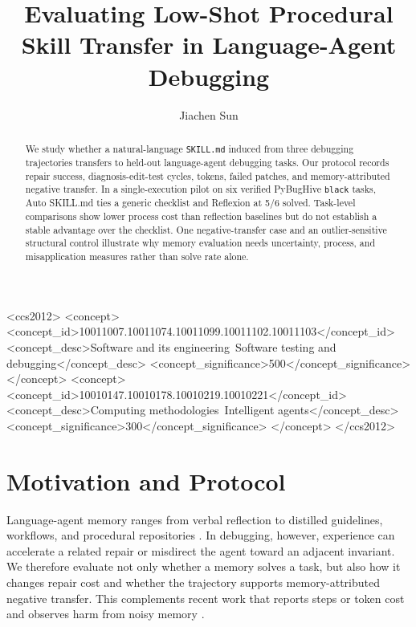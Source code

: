\documentclass[sigconf,screen,pbalance]{acmart}
\begin{document}
\shrinkLastPage{75pt}

\title{Evaluating Low-Shot Procedural Skill Transfer in Language-Agent
Debugging}

\author{Jiachen Sun}
\correspondingauthor
{}

\begin{abstract}
We study whether a natural-language \texttt{SKILL.md} induced from three
debugging trajectories transfers to held-out language-agent debugging tasks.
Our protocol records repair success, diagnosis-edit-test cycles, tokens,
failed patches, and memory-attributed negative transfer. In a single-execution
pilot on six verified PyBugHive \texttt{black} tasks, Auto SKILL.md ties a
generic checklist and Reflexion at 5/6 solved. Task-level comparisons show
lower process cost than reflection baselines but do not establish a stable
advantage over the checklist. One negative-transfer case and an outlier-sensitive
structural control illustrate why memory evaluation needs uncertainty,
process, and misapplication measures rather than solve rate alone.
\end{abstract}

\begin{CCSXML}
<ccs2012>
   <concept>
       <concept_id>10011007.10011074.10011099.10011102.10011103</concept_id>
       <concept_desc>Software and its engineering~Software testing and debugging</concept_desc>
       <concept_significance>500</concept_significance>
   </concept>
   <concept>
       <concept_id>10010147.10010178.10010219.10010221</concept_id>
       <concept_desc>Computing methodologies~Intelligent agents</concept_desc>
       <concept_significance>300</concept_significance>
   </concept>
</ccs2012>
\end{CCSXML}



\maketitle

\section{Motivation and Protocol}
Language-agent memory ranges from verbal reflection to distilled guidelines,
workflows, and procedural repositories
\cite{shinn2023reflexion,zhao2024expel,wang2025workflowmemory,fang2026memp}.
In debugging, however, experience can accelerate a related repair or misdirect
the agent toward an adjacent invariant. We therefore evaluate not only whether
a memory solves a task, but also how it changes repair cost and whether the
trajectory supports memory-attributed negative transfer. This complements
recent work that reports steps or token cost and observes harm from noisy
memory \cite{ouyang2026reasoningbank}.
\end{document}

